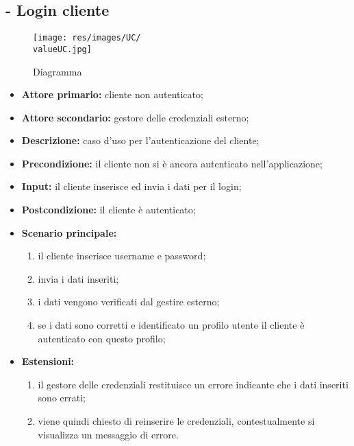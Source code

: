 \subsection{ - Login cliente}
\begin{figure}[H]
    \centering
    \texttt{[image: res/images/UC/\\valueUC.jpg]}
    \caption{Diagramma }
\end{figure}
\begin{itemize}
    \item \textbf{Attore primario:} cliente non autenticato;
    \item \textbf{Attore secondario:} gestore delle credenziali esterno;
    \item \textbf{Descrizione:} caso d'uso per l'autenticazione del cliente;
    \item \textbf{Precondizione:} il cliente non si è ancora autenticato nell'applicazione;
    \item \textbf{Input:} il cliente inserisce ed invia i dati per il login;
    \item \textbf{Postcondizione:} il cliente è autenticato;
    \item \textbf{Scenario principale:}
          \begin{enumerate}
              \item il cliente inserisce username e password;
              \item invia i dati inseriti;
              \item i dati vengono verificati dal gestire esterno;
              \item se i dati sono corretti e identificato un profilo utente il cliente è autenticato con questo profilo;
          \end{enumerate}
    \item \textbf{Estensioni:}
          \begin{enumerate}
              \item il gestore delle credenziali restituisce un errore indicante che i dati inseriti sono errati;
              \item viene quindi chiesto di reinserire le credenziali, contestualmente si visualizza un messaggio di errore.
          \end{enumerate}
\end{itemize}

\stepUserCase
